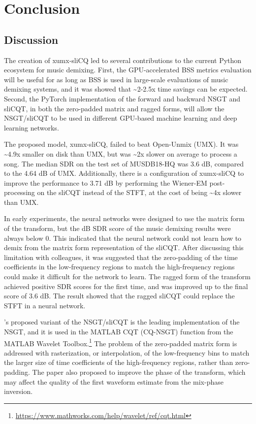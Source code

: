 \documentclass[report.tex]{subfiles}
\begin{document}
\section{Conclusion}
\label{sec:conclusion}

\subsection{Discussion}

The creation of xumx-sliCQ led to several contributions to the current Python ecosystem for music demixing. First, the GPU-accelerated BSS metrics evaluation will be useful for as long as BSS is used in large-scale evaluations of music demixing systems, and it was showed that \textasciitilde2-2.5x time savings can be expected. Second, the PyTorch implementation of the forward and backward NSGT and sliCQT, in both the zero-padded matrix and ragged forms, will allow the NSGT/sliCQT to be used in different GPU-based machine learning and deep learning networks.

The proposed model, xumx-sliCQ, failed to beat Open-Unmix (UMX). It was \textasciitilde4.9x smaller on disk than UMX, but was \textasciitilde2x slower on average to process a song. The median SDR on the test set of MUSDB18-HQ was 3.6 dB, compared to the 4.64 dB of UMX. Additionally, there is a configuration of xumx-sliCQ to improve the performance to 3.71 dB by performing the Wiener-EM post-processing on the sliCQT instead of the STFT, at the cost of being \textasciitilde4x slower than UMX.

In early experiments, the neural networks were designed to use the matrix form of the transform, but the dB SDR score of the music demixing results were always below 0. This indicated that the neural network could not learn how to demix from the matrix form representation of the sliCQT. After discussing this limitation with colleagues, it was suggested that the zero-padding of the time coefficients in the low-frequency regions to match the high-frequency regions could make it difficult for the network to learn. The ragged form of the transform achieved positive SDR scores for the first time, and was improved up to the final score of 3.6 dB. The result showed that the ragged sliCQT could replace the STFT in a neural network.

\textcite{variableq1}'s proposed variant of the NSGT/sliCQT is the leading implementation of the NSGT, and it is used in the MATLAB CQT (CQ-NSGT) function from the MATLAB Wavelet Toolbox.\footnote{\url{https://www.mathworks.com/help/wavelet/ref/cqt.html}} The problem of the zero-padded matrix form is addressed with rasterization, or interpolation, of the low-frequency bins to match the larger size of time coefficients of the high-frequency regions, rather than zero-padding. The paper also proposed to improve the phase of the transform, which may affect the quality of the first waveform estimate from the mix-phase inversion.
\end{document}
